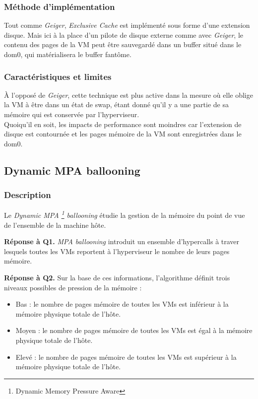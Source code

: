 \subsubsection{Méthode d'implémentation}
Tout comme \textit{Geiger}, \textit{Exclusive Cache} est implémenté sous forme d'une extension disque. Mais ici à la place d'un pilote de disque externe comme avec \textit{Geiger}, le contenu des pages de la VM peut être sauvegardé dans un buffer situé dans le dom0, qui matérialisera le buffer fantôme.

\subsubsection{Caractéristiques et limites}
À l'opposé de \textit{Geiger}, cette technique est plus active dans la mesure où elle oblige la VM à être dans un état de swap, étant donné qu'il y a une partie de sa mémoire qui est conservée par l'hyperviseur.\\
Quoiqu'il en soit, les impacts de performance sont moindres car l'extension de disque est contournée et les pages mémoire de la VM sont enregistrées dans le dom0.

\subsection{Dynamic MPA ballooning}

\subsubsection{Description}
Le \textit{Dynamic MPA \footnote{Dynamic Memory Pressure Aware} ballooning} \cite{dmpa} étudie la gestion de la mémoire du point de vue de l'ensemble de la machine hôte.

\par{\textbf{Réponse à Q1.}} \textit{MPA ballooning} introduit un ensemble d'hypercalls à traver lesquels toutes les VMs reportent à l'hyperviseur le nombre de leurs pages mémoire. 
\par{\textbf{Réponse à Q2.}} Sur la base de ces informations, l'algorithme définit trois niveaux possibles de pression de la mémoire : 
\begin{itemize}
    \item Bas : le nombre de pages mémoire de toutes les VMs est inférieur à la mémoire physique totale de l'hôte.
    \item Moyen : le nombre de pages mémoire de toutes les VMs est égal à la mémoire physique totale de l'hôte.
    \item Elevé : le nombre de pages mémoire de toutes les VMs est supérieur à la mémoire physique totale de l'hôte.
\end{itemize}

